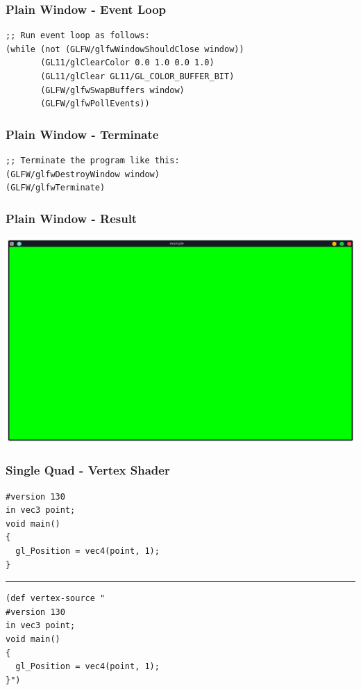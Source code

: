 \documentclass[aspectratio=169,11pt,xcolor=dvipsnames]{beamer}
\begin{document}
\begin{frame}[fragile]
  \frametitle{Plain Window {-} Event Loop}
  \begin{verbatim}
;; Run event loop as follows:
(while (not (GLFW/glfwWindowShouldClose window))
       (GL11/glClearColor 0.0 1.0 0.0 1.0)
       (GL11/glClear GL11/GL_COLOR_BUFFER_BIT)
       (GLFW/glfwSwapBuffers window)
       (GLFW/glfwPollEvents))
  \end{verbatim}
\end{frame}

\begin{frame}[fragile]
  \frametitle{Plain Window {-} Terminate}
  \begin{verbatim}
;; Terminate the program like this:
(GLFW/glfwDestroyWindow window)
(GLFW/glfwTerminate)
  \end{verbatim}
\end{frame}

\begin{frame}
  \frametitle{Plain Window {-} Result}
  \begin{center}
    \includegraphics[width=.8\textwidth]{window}
  \end{center}
\end{frame}

\begin{frame}[fragile]
  \frametitle{Single Quad {-} Vertex Shader}
  \begin{verbatim}
#version 130
in vec3 point;
void main()
{
  gl_Position = vec4(point, 1);
}
  \end{verbatim}
  \rule{\textwidth}{1pt}
  \begin{verbatim}
(def vertex-source "
#version 130
in vec3 point;
void main()
{
  gl_Position = vec4(point, 1);
}")
  \end{verbatim}
\end{frame}
\end{document}
